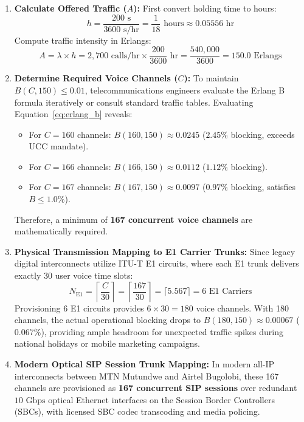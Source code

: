 \documentclass[12pt,a4paper]{report}
\begin{document}
\begin{enumerate}
    \item \textbf{Calculate Offered Traffic ($A$):}
    First convert holding time to hours:
    \[ h = \frac{200\text{ s}}{3600\text{ s/hr}} = \frac{1}{18}\text{ hours} \approx 0.05556\text{ hr} \]
    Compute traffic intensity in Erlangs:
    \[ A = \lambda \times h = 2,700\text{ calls/hr} \times \frac{200}{3600}\text{ hr} = \frac{540,000}{3600} = 150.0\text{ Erlangs} \]

    \item \textbf{Determine Required Voice Channels ($C$):}
    To maintain $B(C, 150) \le 0.01$, telecommunications engineers evaluate the Erlang B formula iteratively or consult standard traffic tables. Evaluating Equation~\eqref{eq:erlang_b} reveals:
    \begin{itemize}
        \item For $C = 160$ channels: $B(160, 150) \approx 0.0245$ ($2.45\%$ blocking, exceeds UCC mandate).
        \item For $C = 166$ channels: $B(166, 150) \approx 0.0112$ ($1.12\%$ blocking).
        \item For $C = 167$ channels: $B(167, 150) \approx 0.0097$ ($0.97\%$ blocking, satisfies $B \le 1.0\%$).
    \end{itemize}
    Therefore, a minimum of \textbf{167 concurrent voice channels} are mathematically required.

    \item \textbf{Physical Transmission Mapping to E1 Carrier Trunks:}
    Since legacy digital interconnects utilize ITU-T E1 circuits, where each E1 trunk delivers exactly 30 user voice time slots:
    \[ N_{\text{E1}} = \left\lceil \frac{C}{30} \right\rceil = \left\lceil \frac{167}{30} \right\rceil = \lceil 5.567 \rceil = 6\text{ E1 Carriers} \]
    Provisioning 6 E1 circuits provides $6 \times 30 = 180$ voice channels. With 180 channels, the actual operational blocking drops to $B(180, 150) \approx 0.00067$ ($0.067\%$), providing ample headroom for unexpected traffic spikes during national holidays or mobile marketing campaigns.

    \item \textbf{Modern Optical SIP Session Trunk Mapping:}
    In modern all-IP interconnects between MTN Mutundwe and Airtel Bugolobi, these 167 channels are provisioned as \textbf{167 concurrent SIP sessions} over redundant $10\text{ Gbps}$ optical Ethernet interfaces on the Session Border Controllers (SBCs), with licensed SBC codec transcoding and media policing.
\end{enumerate}
\end{document}
